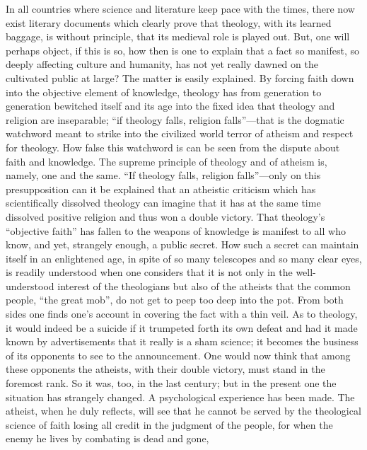 \documentclass[12pt,a4paper,openany]{book}
\newcommand{\opage}[1]{\marginnote{\footnotesize\textit{[#1]}}}
\begin{document}
In all countries where science and literature keep
pace with the times, there now exist literary documents which
\setcounter{footnote}{0}%
\opage{523}clearly prove that theology, with its learned baggage,
is without principle, that its medieval role is played out.
But, one will perhaps object, if this
is so, how then is one to explain
that a fact so manifest, so
deeply affecting culture and humanity, has not yet really dawned
on the cultivated public at large? The matter is easily explained.
By forcing faith down into the objective element of knowledge,
theology has from generation to generation bewitched itself and its age
into the fixed idea that theology and religion are inseparable;
``if theology falls, religion falls''---that is the
dogmatic watchword meant to strike into the civilized world
terror of atheism and respect for theology. How
false this watchword is can be seen from the dispute about faith and
knowledge. The supreme principle of theology and of atheism
is, namely, one and the same. ``If theology falls,
religion falls''---only on this presupposition can it
be explained that an atheistic criticism which has scientifically
dissolved theology can imagine that it has at the
same time dissolved positive religion and thus
won a double victory. That theology's ``objective faith'' has
fallen to the weapons of knowledge is manifest to all who know, and
yet, strangely enough, a public secret. How
such a secret can maintain itself in an enlightened
age, in spite of so many telescopes and so many clear
eyes, is readily understood when one considers that it is not
only in the well-understood interest of the theologians but also of the atheists
that the common people, ``the great
mob'', do not get to peep too deep into the pot. From
both sides one finds one's account in covering the fact
with a thin veil. As to theology,
\setcounter{footnote}{0}%
\opage{524}it would indeed be a suicide if it trumpeted forth its
own defeat and had it made known by advertisements
that it really is a sham science; it becomes
the business of its opponents to see to the announcement. One
would now think that among these opponents
the atheists, with their double victory, must stand in the foremost
rank. So it was, too, in the last century;
but in the present one the situation has strangely
changed. A psychological experience has been made.
The atheist, when he duly reflects, will see that he
cannot be served by the theological science of faith
losing all credit in the judgment of the people, for when the
enemy he lives by combating is dead and gone,
\end{document}
